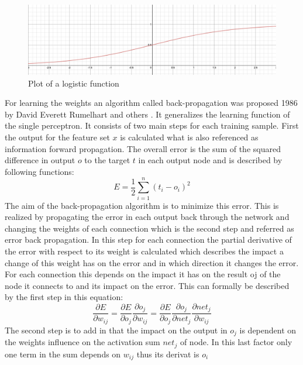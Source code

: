 \begin{figure}[htpb]
  \centering
  \includegraphics[width = \textwidth]{figures/logisticFunc.png}
  \caption{Plot of a logistic function}
  \label{fig:logisFunction}
\end{figure}
For learning the weights an algorithm called back-propagation was proposed 1986 by David Everett Rumelhart and others \cite{rumelhart1988learning}. It generalizes the learning function of the single perceptron. It consists of two main steps for each training sample. First the output for the feature set $x$ is calculated what is also referenced as information forward propagation. The overall error is the sum of the squared difference in output $o$ to the target $t$ in each output node and is described by following functions:
\begin{equation}\label{eq:backpErr}
  E = \frac{1}{2} \sum_{i=1}^n (t_i-o_i)^2
\end{equation}
The aim of the back-propagation algorithm is to minimize this error. This is realized by propagating the error in each output back through the network and changing the weights of each connection which is the second step and referred as error back propagation. In this step for each connection the partial derivative of the error with respect to its weight is calculated which describes the impact a change of this weight has on the error and in which direction it changes the error. For each connection this depends on the impact it has on the result oj of the node it connects to and its impact on the error.
\newline
This can formally be described by the first step in this equation:
\begin{equation}\label{eq:backpMainDevi}
  \frac{\partial E}{\partial w_{ij}} =
  \frac{\partial E}{\partial o_j} \frac{\partial o_j}{\partial w_{ij}} = 
  \frac{\partial E}{\partial o_j} \frac{\partial o_j}{\partial net_j} \frac{\partial net_j}{\partial w_{ij}}
\end{equation}
The second step is to add in that the impact on the output in $o_j$ is dependent on the weights influence on the activation sum $net_j$ of node. In this last factor only one term in the sum depends on $w_{ij}$ thus its derivat is $o_i$
